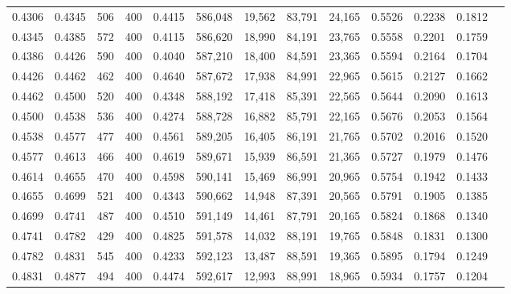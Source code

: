 \begin{tabular}{rrrrrrrrrrrrr}
0.4306 & 0.4345 &    506 &   400 &                                     0.4415 & 586,048 &  19,562 &  83,791 &  24,165 & 0.5526 & 0.2238 & 0.1812 \\
0.4345 & 0.4385 &    572 &   400 &                                     0.4115 & 586,620 &  18,990 &  84,191 &  23,765 & 0.5558 & 0.2201 & 0.1759 \\
0.4386 & 0.4426 &    590 &   400 &                                     0.4040 & 587,210 &  18,400 &  84,591 &  23,365 & 0.5594 & 0.2164 & 0.1704 \\
0.4426 & 0.4462 &    462 &   400 &                                     0.4640 & 587,672 &  17,938 &  84,991 &  22,965 & 0.5615 & 0.2127 & 0.1662 \\
0.4462 & 0.4500 &    520 &   400 &                                     0.4348 & 588,192 &  17,418 &  85,391 &  22,565 & 0.5644 & 0.2090 & 0.1613 \\
0.4500 & 0.4538 &    536 &   400 &                                     0.4274 & 588,728 &  16,882 &  85,791 &  22,165 & 0.5676 & 0.2053 & 0.1564 \\
0.4538 & 0.4577 &    477 &   400 &                                     0.4561 & 589,205 &  16,405 &  86,191 &  21,765 & 0.5702 & 0.2016 & 0.1520 \\
0.4577 & 0.4613 &    466 &   400 &                                     0.4619 & 589,671 &  15,939 &  86,591 &  21,365 & 0.5727 & 0.1979 & 0.1476 \\
0.4614 & 0.4655 &    470 &   400 &                                     0.4598 & 590,141 &  15,469 &  86,991 &  20,965 & 0.5754 & 0.1942 & 0.1433 \\
0.4655 & 0.4699 &    521 &   400 &                                     0.4343 & 590,662 &  14,948 &  87,391 &  20,565 & 0.5791 & 0.1905 & 0.1385 \\
0.4699 & 0.4741 &    487 &   400 &                                     0.4510 & 591,149 &  14,461 &  87,791 &  20,165 & 0.5824 & 0.1868 & 0.1340 \\
0.4741 & 0.4782 &    429 &   400 &                                     0.4825 & 591,578 &  14,032 &  88,191 &  19,765 & 0.5848 & 0.1831 & 0.1300 \\
0.4782 & 0.4831 &    545 &   400 &                                     0.4233 & 592,123 &  13,487 &  88,591 &  19,365 & 0.5895 & 0.1794 & 0.1249 \\
0.4831 & 0.4877 &    494 &   400 &                                     0.4474 & 592,617 &  12,993 &  88,991 &  18,965 & 0.5934 & 0.1757 & 0.1204 \\

\end{tabular}
